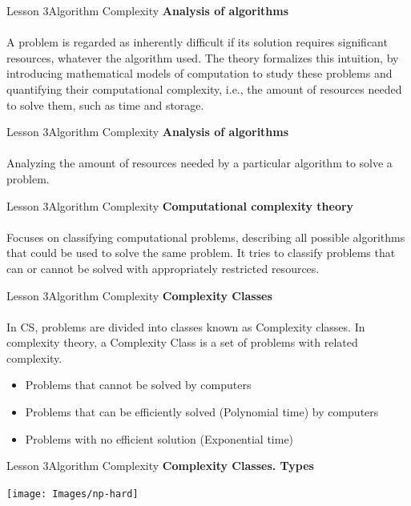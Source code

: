 \documentclass[aspectratio=1610]{beamer}
\begin{document}
\begin{frame}{Lesson 3}{Algorithm Complexity}
\LARGE
\textbf{Analysis of algorithms}\\~\\
\Large
A problem is regarded as inherently difficult if its solution
requires significant resources, whatever the algorithm used. The
theory formalizes this intuition, by introducing mathematical models
of computation to study these problems and quantifying their
computational complexity, i.e., the amount of resources needed to
solve them, such as time and storage.
\end{frame}

 
\begin{frame}{Lesson 3}{Algorithm Complexity}
\LARGE
\textbf{Analysis of algorithms}\\~\\
\Large
Analyzing the amount of resources needed by a particular algorithm
to solve a problem.
\end{frame}


\begin{frame}{Lesson 3}{Algorithm Complexity}
\LARGE
\textbf{Computational complexity theory}\\~\\
\Large
Focuses on classifying computational problems, describing all
possible algorithms that could be used to solve the same problem. 
It tries to classify problems that can or cannot be solved with
appropriately restricted resources.
\end{frame}
 
 

\begin{frame}{Lesson 3}{Algorithm Complexity}
\LARGE
\textbf{Complexity Classes}\\~\\
\Large
In CS, problems are divided into classes known as Complexity
classes. In complexity theory, a Complexity Class is a
set of problems with related complexity.
\begin{itemize}
	\item Problems that cannot be solved by computers
	\item Problems that can be efficiently solved (Polynomial time) by computers
	\item Problems with no efficient solution (Exponential time)
\end{itemize}
\end{frame}


\begin{frame}{Lesson 3}{Algorithm Complexity}
\LARGE
\textbf{Complexity Classes. Types}\\
\begin{center}
\texttt{[image: Images/np-hard]}
\end{center}
\end{frame}
\end{document}

